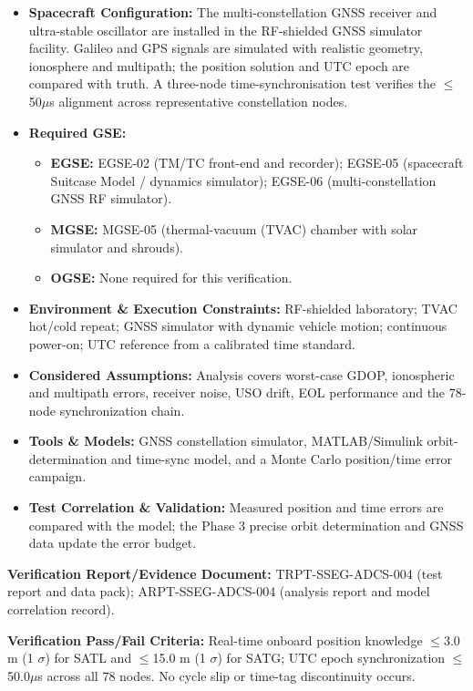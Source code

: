 \begin{itemize}
\item \textbf{Spacecraft Configuration:} The multi-constellation GNSS receiver and ultra-stable oscillator are installed in the RF-shielded GNSS simulator facility. Galileo and GPS signals are simulated with realistic geometry, ionosphere and multipath; the position solution and UTC epoch are compared with truth. A three-node time-synchronisation test verifies the $\le$50$\mu$s alignment across representative constellation nodes.
\item \textbf{Required GSE:}
\begin{itemize}
\item \textbf{EGSE:} EGSE-02 (TM/TC front-end and recorder); EGSE-05 (spacecraft Suitcase Model / dynamics simulator); EGSE-06 (multi-constellation GNSS RF simulator).
\item \textbf{MGSE:} MGSE-05 (thermal-vacuum (TVAC) chamber with solar simulator and shrouds).
\item \textbf{OGSE:} None required for this verification.
\end{itemize}
\item \textbf{Environment \& Execution Constraints:} RF-shielded laboratory; TVAC hot/cold repeat; GNSS simulator with dynamic vehicle motion; continuous power-on; UTC reference from a calibrated time standard.
\item \textbf{Considered Assumptions:} Analysis covers worst-case GDOP, ionospheric and multipath errors, receiver noise, USO drift, EOL performance and the 78-node synchronization chain.
\item \textbf{Tools \& Models:} GNSS constellation simulator, MATLAB/Simulink orbit-determination and time-sync model, and a Monte Carlo position/time error campaign.
\item \textbf{Test Correlation \& Validation:} Measured position and time errors are compared with the model; the Phase 3 precise orbit determination and GNSS data update the error budget.
\end{itemize}
\par\textbf{Verification Report/Evidence Document:} TRPT-SSEG-ADCS-004 (test report and data pack); ARPT-SSEG-ADCS-004 (analysis report and model correlation record).
\par\textbf{Verification Pass/Fail Criteria:} Real-time onboard position knowledge $\le$3.0 m (1 $\sigma$) for SATL and $\le$15.0 m (1 $\sigma$) for SATG; UTC epoch synchronization $\le$50.0$\mu$s across all 78 nodes. No cycle slip or time-tag discontinuity occurs.
\par\medskip
